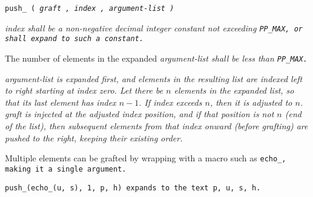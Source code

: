 
\tt{push_ (} \it{graft} \tt{,} \it{index} \tt{,} \it{argument-list} \tt{)}


\it{index} shall be a non-negative decimal integer constant not
exceeding \tt{PP_MAX}, or shall expand to such a constant.

The number of elements in the expanded
\it{argument-list} shall be less than \tt{PP_MAX}.


\it{argument-list} is expanded first, and elements in the
resulting list are indexed left to right starting at index zero.
Let there be $n$ elements in the expanded list,
so that its last element has index $n - 1$.
If \it{index} exceeds $n$, then it is adjusted to $n$.
\it{graft} is injected at the adjusted index position, and if that position is
not $n$ (end of the list), then subsequent elements from that index onward
(before grafting) are pushed to the right, keeping their existing order.

\note Multiple elements can be grafted by wrapping with
a macro such as \tt{echo_}, making it a single argument.

\example \tt{push_(echo_(u, s), 1, p, h)} expands to the text \tt{p, u, s, h}.
